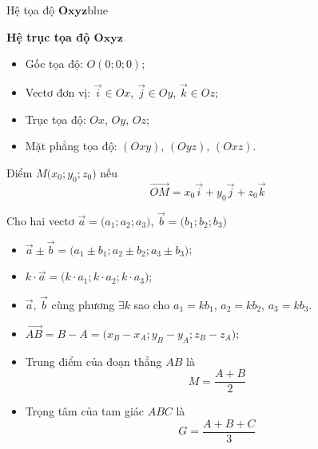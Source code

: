 \documentclass[12pt,a4paper,landscape]{book}
\begin{document}
	\newpage
	\begin{multicols*}{3}
		\begin{khung_trello}{Hệ tọa độ $\mathbf{Oxyz}$}{blue}
			\begin{khung_trello_box}
				\textbf{\color{trello_bg_blue}Hệ trục tọa độ $\mathbf{Oxyz}$}
				\begin{itemize}[leftmargin=5mm,label={\color{trello_bg_blue}$\blacksquare$}]
					\item Gốc tọa độ: $O(0;0;0)$;
					\item Vectơ đơn vị: $\overrightarrow{i}\in Ox$, $\overrightarrow{j}\in Oy$, $\overrightarrow{k}\in Oz$;
					\item Trục tọa độ: $Ox$, $Oy$, $Oz$;
					\item Mặt phẳng tọa độ: $(Oxy)$, $(Oyz)$, $(Oxz)$.
				\end{itemize}
			\end{khung_trello_box}
			\begin{khung_trello_box}
				Điểm $M\big(x_0;y_0;z_0\big)$ nếu $$\overrightarrow{OM}=x_0\overrightarrow{i}+y_0\overrightarrow{j}+z_0\overrightarrow{k}$$
			\end{khung_trello_box}
			\begin{khung_trello_box}
				Cho hai vectơ $\overrightarrow{a}=\big(a_1;a_2;a_3\big)$, $\overrightarrow{b}=\big(b_1;b_2;b_3\big)$
				\begin{itemize}[leftmargin=5mm,label={\color{trello_bg_blue}$\heartsuit$}]
					\item $\overrightarrow{a}\pm\overrightarrow{b}=\big(a_1\pm b_1;a_2\pm b_2;a_3\pm b_3\big)$;
					\item $k\cdot\overrightarrow{a}=\big(k\cdot a_1;k\cdot a_2;k\cdot a_3\big)$;
					\item $\overrightarrow{a},\,\overrightarrow{b}$ cùng phương $\exists k$ sao cho $a_1=kb_1$, $a_2=kb_2$, $a_3=kb_3$.
				\end{itemize}
			\end{khung_trello_box}
			\begin{khung_trello_box}
				\begin{itemize}[leftmargin=5mm,label={\color{trello_bg_blue}$\heartsuit$}]
					\item $\overrightarrow{AB}=B-A=\big(x_B-x_A;y_B-y_A;z_B-z_A\big)$;
					\item Trung điểm của đoạn thẳng $AB$ là $$M=\dfrac{A+B}{2}$$
					\item Trọng tâm của tam giác $ABC$ là $$G=\dfrac{A+B+C}{3}$$

\end{itemize}
\end{khung_trello_box}
\end{khung_trello}
\end{multicols*}
\end{document}
